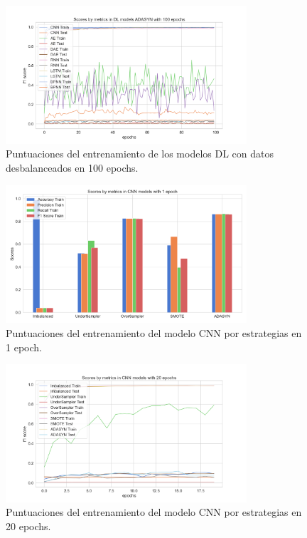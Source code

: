 \begin{figure}[h!]
	\centering
	\includegraphics[width=0.8\textwidth]{"figuras/Experimento5/ADASYN/DL_ADASYN_100_train"}
	\caption{Puntuaciones del entrenamiento de los modelos DL con datos desbalanceados en 100 epochs.}
	\label{an:26}
\end{figure}

\begin{figure}[h!]
	\centering
	\includegraphics[width=0.8\textwidth]{"figuras/Experimento5/CNN/CNN_1_train"}
	\caption{Puntuaciones del entrenamiento del modelo CNN por estrategias en 1 epoch.}
	\label{an:27}
\end{figure}

\begin{figure}[h!]
	\centering
	\includegraphics[width=0.8\textwidth]{"figuras/Experimento5/CNN/CNN_20_train"}
	\caption{Puntuaciones del entrenamiento del modelo CNN por estrategias en 20 epochs.}
	\label{an:28}
\end{figure}

